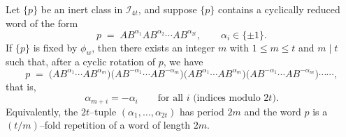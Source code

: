 \documentclass[10pt,a4paper]{amsart}
\begin{document}
\begin{lemma}\label{2.1}
Let $\{p\}$ be an inert class in $\mathscr{I}_{4t}$, and suppose
$\{p\}$ contains a cyclically reduced word of the form
\[
p \;=\; AB^{\alpha_1}AB^{\alpha_2}\cdots AB^{\alpha_{2t}}, 
\qquad \alpha_i \in \{\pm 1\}.
\]
If $\{p\}$ is fixed by $\phi_w$, then there exists an integer $m$ with 
$1 \le m \le t$ and $m \mid t$ such that, after a cyclic rotation of $p$, we have
\[
p \;=\;
\big(AB^{\alpha_1}\cdots AB^{\alpha_m}\big)
\big(AB^{-\alpha_1}\cdots AB^{-\alpha_m}\big)
\big(AB^{\alpha_1}\cdots AB^{\alpha_m}\big)
\big(AB^{-\alpha_1}\cdots AB^{-\alpha_m}\big)\cdots\cdots,
\]
that is,
\[
\alpha_{m+i} = -\alpha_i \qquad \text{for all $i$ (indices modulo $2t$)}.
\]
Equivalently, the $2t$--tuple $(\alpha_1,\dots,\alpha_{2t})$ has period $2m$
and the word $p$ is a $(t/m)$--fold repetition of a word of length $2m$.
\end{lemma}
\end{document}
